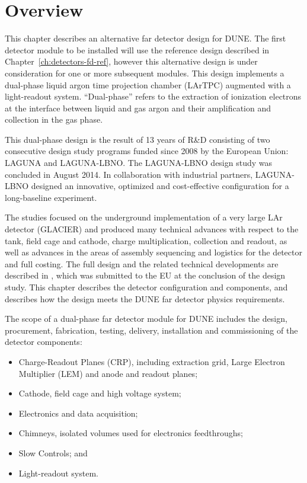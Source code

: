 \section{Overview}
\label{sec:detectors-fd-alt-ov}

This chapter describes an alternative far detector design for
DUNE. The first detector module to be installed will use the reference
design described in Chapter~\ref{ch:detectors-fd-ref}, however this alternative
 design is under consideration for one or more
subsequent modules. This design implements a dual-phase liquid argon
time projection chamber (LArTPC) augmented with a light-readout
system. ``Dual-phase'' refers to the extraction of ionization
electrons at the interface between liquid and gas argon and their
amplification and collection in the gas phase.

This dual-phase design is the result of 13 years of R\&D consisting of two
consecutive design study programs funded since 2008 by the European
Union: LAGUNA and LAGUNA-LBNO. The LAGUNA-LBNO design study was
concluded in August 2014.  In collaboration with industrial partners,
LAGUNA-LBNO designed an innovative, optimized and cost-effective
configuration for a long-baseline experiment.

The studies focused on the underground implementation of a very large
LAr detector (GLACIER) and produced many technical advances with respect to
the tank, field cage and cathode, charge multiplication, collection and readout, as well as 
advances in the areas of assembly sequencing and logistics for the detector and 
full costing. The full design and the related
technical developments are described in \anxlbnob, which was submitted to the
EU at the conclusion of the design study. This chapter describes the detector
configuration and components, and describes how the design meets the DUNE
far detector physics requirements.

The scope of a dual-phase far detector module for DUNE includes the design,
procurement, fabrication, testing, delivery, installation and
commissioning of the detector components:
\begin{itemize}
\item Charge-Readout Planes (CRP), including extraction grid, Large Electron Multiplier (LEM) and anode and readout planes;
\item Cathode, field cage and high voltage system;  
\item Electronics and data acquisition; 
\item Chimneys, isolated volumes used for electronics feedthroughs;  
\item Slow Controls; and
\item Light-readout system.
\end{itemize}

